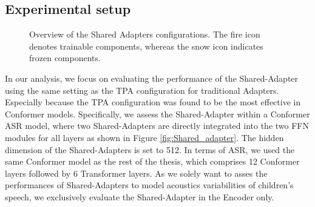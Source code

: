 \subsection{Experimental setup}
\begin{figure}[h]
    \centering
    \caption{Overview of the Shared Adapters configurations. The fire icon denotes trainable components, whereas the snow icon indicates frozen components.}
\end{figure}


In our analysis, we focus on evaluating the performance of the Shared-Adapter using the same setting as the \ac{TPA} configuration for traditional Adapters. Especially because the \ac{TPA} configuration was found to be the most effective in Conformer models. Specifically, we assess the Shared-Adapter within a Conformer \ac{ASR} model, where two Shared-Adapters are directly integrated into the two \ac{FFN} modules for all layers as shown in Figure \ref{fig:Shared_adapter}.  The hidden dimension of the Shared-Adapters is set to 512. In terms of \ac{ASR}, we used the same Conformer model as the rest of the thesis, which comprises 12 Conformer layers followed by 6 Transformer layers. As we solely want to asses the performances of Shared-Adapters to model acoustics variabilities of children's speech, we exclusively evaluate the Shared-Adapter in the Encoder only.

